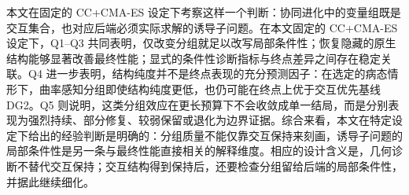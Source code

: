 本文在固定的 CC+CMA-ES 设定下考察这样一个判断：协同进化中的变量组既是交互集合，也对应后端必须实际求解的诱导子问题。在本文固定的 CC+CMA-ES 设定下，Q1--Q3 共同表明，仅改变分组就足以改写局部条件性；恢复隐藏的原生结构能够显著改善最终性能；显式的条件性诊断指标与终点差异之间存在稳定关联。Q4 进一步表明，结构纯度并不是终点表现的充分预测因子：在选定的病态情形下，曲率感知分组即使结构纯度更低，也仍可能在终点上优于交互优先基线 DG2。Q5 则说明，这类分组效应在更长预算下不会收敛成单一结局，而是分别表现为强烈持续、部分修复、较弱保留或退化为边界证据。综合来看，本文在特定设定下给出的经验判断是明确的：分组质量不能仅靠交互保持来刻画，诱导子问题的局部条件性是另一条与最终性能直接相关的解释维度。相应的设计含义是，几何诊断不替代交互保持；交互结构得到保持后，还要检查分组留给后端的局部条件性，并据此继续细化。
